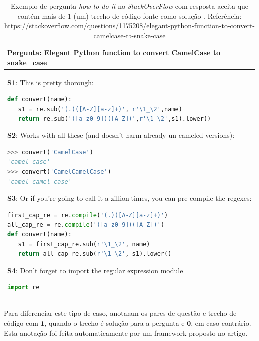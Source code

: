 \begin{table}[h!]
\centering
\begin{tabular}{ |p{14cm}| } 
 \hline
\textbf{Pergunta:} Elegant Python function to
convert CamelCase to snake\_case \\ \hline
\textbf{S1}: This is pretty thorough:

\begin{lstlisting}[language=python, caption={C1}]
 def convert(name):
   s1 = re.sub('(.)([A-Z][a-z]+)', r'\1_\2',name)
   return re.sub('([a-z0-9])([A-Z])',r'\1_\2',s1).lower()
\end{lstlisting}

\textbf{S2}: Works with all these (and doesn't harm already-un-cameled versions):

\begin{lstlisting}[language=python, caption={C2}]
 >>> convert('CamelCase')
'camel_case'
>>> convert('CamelCamelCase')
'camel_camel_case'
\end{lstlisting}

\textbf{S3}: Or if you're going to call it a zillion times, you can pre-compile the regexes:

\begin{lstlisting}[language=python, caption={C3}]
first_cap_re = re.compile('(.)([A-Z][a-z]+)')
all_cap_re = re.compile('([a-z0-9])([A-Z])')
def convert(name):
   s1 = first_cap_re.sub(r'\1_\2', name)
   return all_cap_re.sub(r'\1_\2', s1).lower()
\end{lstlisting}

\textbf{S4}: Don't forget to import the regular expression module
\begin{lstlisting}[language=python, caption={C4}]
import re
\end{lstlisting}

 \\ 
 \hline
\end{tabular}
\caption{Exemplo de pergunta \textit{how-to-do-it} no \textit{StackOverFlow} com resposta aceita que contém mais de 1 (um) trecho de código-fonte como solução \cite{yao-2018}. Referência: \url{https://stackoverflow.com/questions/1175208/elegant-python-function-to-convert-camelcase-to-snake-case}}
\label{table:exemplo-pergunta-stack-over-flow-how-to-do-it}
\end{table}

Para diferenciar este tipo de caso, \cite{yao-2018} anotaram os pares de questão e trecho de código com $\bm{1}$, quando o trecho é solução para a pergunta e $\bm{0}$, em caso contrário. Esta anotação foi feita automaticamente por um framework proposto no artigo.

